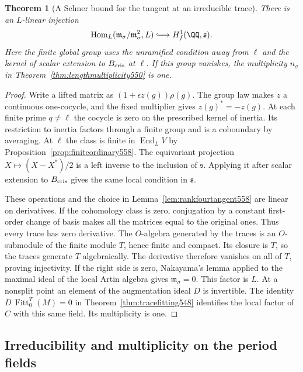 \documentclass[a4paper,11pt]{article}
\newtheorem{theorem}[proposition]{Theorem}
\theoremstyle{definition}
\theoremstyle{remark}
\numberwithin{equation}{section}
\begin{document}
\begin{theorem}[A Selmer bound for the tangent at an irreducible trace]
\leavevmode\label{thm:rankfourselmer558}
There is an \(L\)-linear injection
\[
       \operatorname{Hom}_L(\mathfrak m_\sigma/
             \mathfrak m_\sigma^2,L)
          \lhook\joinrel\longrightarrow H^1_f(\QQ,\mathfrak s).
\]
Here the finite global group uses the unramified condition away
from \(\ell\) and the kernel of scalar extension to \(B_{\rm cris}\)
at \(\ell\). If this group vanishes, the multiplicity
\(n_\sigma\) in Theorem~\ref{thm:lengthmultiplicity550} is one.
\end{theorem}
\begin{proof}
Write a lifted matrix as \((1+\epsilon z(g))\rho(g)\). The
group law makes \(z\) a continuous one-cocycle, and the fixed
multiplier gives \(z(g)^*=-z(g)\). At each finite prime
\(q\ne\ell\) the cocycle is zero on the prescribed kernel of
inertia. Its restriction to inertia factors through a finite
group and is a coboundary by averaging. At \(\ell\) the class
is finite in \(\operatorname{End}_L V\) by
Proposition~\ref{prop:finiteordinary558}. The equivariant
projection \(X\mapsto (X-X^*)/2\) is a left inverse to the
inclusion of \(\mathfrak s\). Applying it after scalar extension
to \(B_{\rm cris}\) gives the same local condition in \(\mathfrak s\).

These operations and the choice in
Lemma~\ref{lem:rankfourtangent558} are linear on derivatives.
If the cohomology class is zero, conjugation by a constant
first-order change of basis makes all the matrices equal to
the original ones. Thus every trace has zero derivative. The
\(O\)-algebra generated by the traces is an \(O\)-submodule of
the finite module \(T\), hence finite and compact. Its closure
is \(T\), so the traces generate \(T\) algebraically. The
derivative therefore vanishes on all of \(T\), proving
injectivity. If the right side is zero, Nakayama's lemma applied
to the maximal ideal of the local Artin algebra gives
\(\mathfrak m_\sigma=0\). This factor is \(L\). At a nonsplit
point an element of the augmentation ideal \(D\) is invertible.
The identity \(D\,\operatorname{Fitt}_0^T(M)=0\) in
Theorem~\ref{thm:tracefitting548} identifies the local factor
of \(C\) with this same field. Its multiplicity is one.
\end{proof}


\subsection{Irreducibility and multiplicity on the period fields}
\label{sec:enormous559}
\end{document}

